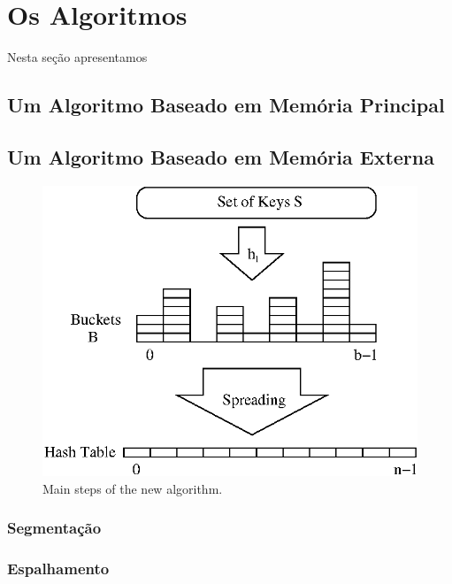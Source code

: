 \section{Os Algoritmos}
\label{sec:thealgorithm}
Nesta se\c{c}\~ao apresentamos \cite{bkz05}
\subsection{Um Algoritmo Baseado em Mem\'oria Principal}

\subsection{Um Algoritmo Baseado em Mem\'oria Externa}
\begin{figure}
\centering
  \includegraphics{figs/brz.ps}
\caption{Main steps of the new algorithm.}
\label{fig:new-algo-main-steps}
\end{figure}

\subsubsection{Segmenta\c{c}\~ao}
\subsubsection{Espalhamento}
